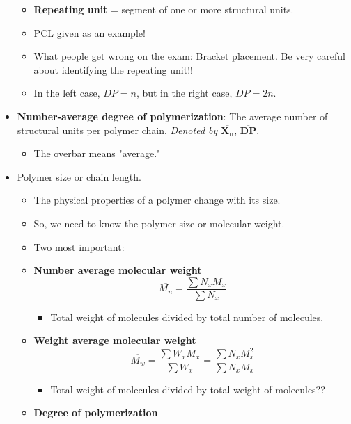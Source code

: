 \documentclass[../notes.tex]{subfiles}
\begin{document}
\begin{itemize}
\begin{itemize}
        \item \textbf{Repeating unit} = segment of one or more structural units.
        \item PCL given as an example!
        \item What people get wrong on the exam: Bracket placement. Be very careful about identifying the repeating unit!!
        \item In the left case, $DP=n$, but in the right case, $DP=2n$.
    \end{itemize}
    \item \textbf{Number-average degree of polymerization}: The average number of structural units per polymer chain. \emph{Denoted by} $\bm{\overline{X_n}}$, $\bm{\overline{DP}}$.
    \begin{itemize}
        \item The overbar means "average."
    \end{itemize}
    \item Polymer size or chain length.
    \begin{itemize}
        \item The physical properties of a polymer change with its size.
        \item So, we need to know the polymer size or molecular weight.
        \item Two most important:
        \item \textbf{Number average molecular weight}
        \begin{equation*}
            \overline{M_n} = \frac{\sum N_xM_x}{\sum N_x}
        \end{equation*}
        \begin{itemize}
            \item Total weight of molecules divided by total number of molecules.
        \end{itemize}
        \item \textbf{Weight average molecular weight}
        \begin{equation*}
            \overline{M_w} = \frac{\sum W_xM_x}{\sum W_x}
            = \frac{\sum N_xM_x^2}{\sum N_xM_x}
        \end{equation*}
        \begin{itemize}
            \item Total weight of molecules divided by total weight of molecules??
        \end{itemize}
        \item \textbf{Degree of polymerization}
        \begin{equation*}

\end{equation*}
\end{itemize}
\end{itemize}
\end{document}
